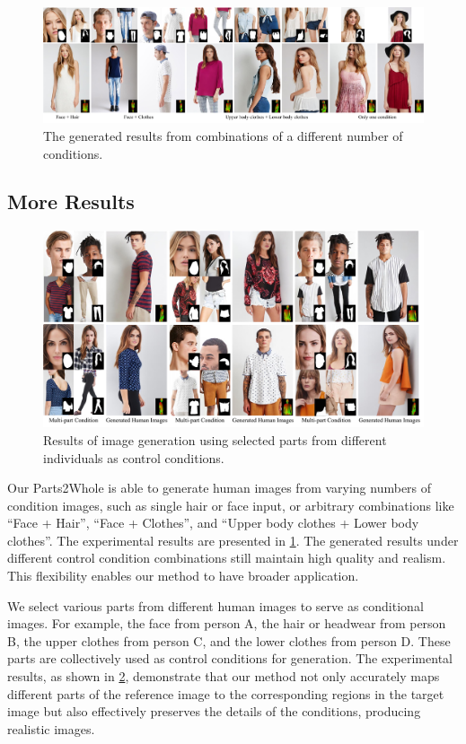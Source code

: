 \begin{figure}
    \centering
    \includegraphics[width=\textwidth]{figure/any_quantity.pdf}
    \caption{The generated results from combinations of a different number of conditions.}
    \label{fig:any_quantity}
\end{figure}

\subsection{More Results}
\begin{figure}
    \centering
    \includegraphics[width=\textwidth]{figure/any_person.pdf}
    \caption{Results of image generation using selected parts from different individuals as control conditions.}
    \label{fig:any_person}
\end{figure}

Our Parts2Whole is able to generate human images from varying numbers of condition images, such as single hair or face input, or arbitrary combinations like ``Face + Hair'', ``Face + Clothes'', and ``Upper body clothes + Lower body clothes''. The experimental results are presented in \cref{fig:any_quantity}. The generated results under different control condition combinations still maintain high quality and realism. This flexibility enables our method to have broader application.

We select various parts from different human images to serve as conditional images. For example, the face from person A, the hair or headwear from person B, the upper clothes from person C, and the lower clothes from person D. These parts are collectively used as control conditions for generation. The experimental results, as shown in \cref{fig:any_person}, demonstrate that our method not only accurately maps different parts of the reference image to the corresponding regions in the target image but also effectively preserves the details of the conditions, producing realistic images.
